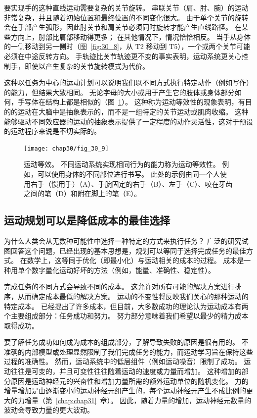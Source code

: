 要实现手的这种直线运动需要复杂的关节旋转。
串联关节（肩、肘、腕）的运动非常复杂，并且随着初始位置和最终位置的不同变化很大。
由于单个关节的旋转会在手部产生弧形，因此肘关节和肩关节必须同时旋转才能产生直线路径。
在某些方向上，肘部比肩部移动得更多；
在其他情况下，情况恰恰相反。
当手从身体的一侧移动到另一侧时（图~\ref{fig:30_8}，从 T2 移动到 T5），一个或两个关节可能必须在中途反转方向。
手轨迹比关节轨迹更不变的事实表明，运动系统更关心控制手，即使以产生复杂的关节旋转模式为代价。


这种以任务为中心的运动计划可以说明我们以不同方式执行特定动作（例如写作）的能力，但结果大致相同。
无论字母的大小或用于产生它的肢体或身体部分如何，手写体在结构上都是相似的（图~\ref{fig:30_9}）。
这种称为运动等效性的现象表明，有目的的运动在大脑中是抽象表示的，而不是一组特定的关节运动或肌肉收缩。
这种能够驱动不同效应器的运动的抽象表示提供了一定程度的动作灵活性，这对于预设的运动程序来说是不切实际的。


\begin{figure}[htbp]
	\centering
	\texttt{[image: chap30/fig\_30\_9]}
	\caption{运动等效。
		不同运动系统实现相同行为的能力称为运动等效性。
		例如，可以使用身体的不同部位进行书写。
		此处的示例由同一个人使用右手（惯用手）（A）、手腕固定的右手（B）、左手（C）、咬在牙齿之间的笔（D）和附在脚上的笔（E）。}
	\label{fig:30_9}
\end{figure}



\subsection{运动规划可以是降低成本的最佳选择}

为什么人类会从无数种可能性中选择一种特定的方式来执行任务？
广泛的研究试图回答这个问题，已经出现的基本思想是，规划可以等同于选择完成任务的最佳方式。
在数学上，这等同于优化（即最小化）与运动相关的成本的过程。
成本是一种用单个数字量化运动好坏的方法（例如，能量、准确性、稳定性）。


完成任务的不同方式会导致不同的成本。
这允许对所有可能的解决方案进行排序，从而确定成本最低的解决方案。
运动的不变性将反映我们关心的那种运动的特定成本。
已经提出了许多成本，但目前，大多数成功的理论认为运动成本有两个主要组成部分：任务成功和努力。
努力部分意味着我们希望以最少的精力成本取得成功。


要了解任务成功如何成为成本的组成部分，了解导致失败的原因是很有用的。
不准确的内部模型或处理显然限制了我们完成任务的能力，而运动学习旨在保持这些过程的准确性。
然而，运动系统中的低层组件（例如运动噪音）限制了成功。
运动往往是可变的，并且可变性往往随着运动的速度或力量而增加。
这种增加的部分原因是运动神经元的兴奋性和增加力量所需的额外运动单位的随机变化。
力的增量增加是由逐渐变小的运动神经元组产生的，每个运动神经元产生不成比例的更大的力增量（第~\ref{chap:chap31}~章）。
因此，随着力量的增加，运动神经元数量的波动会导致力量的更大波动。


